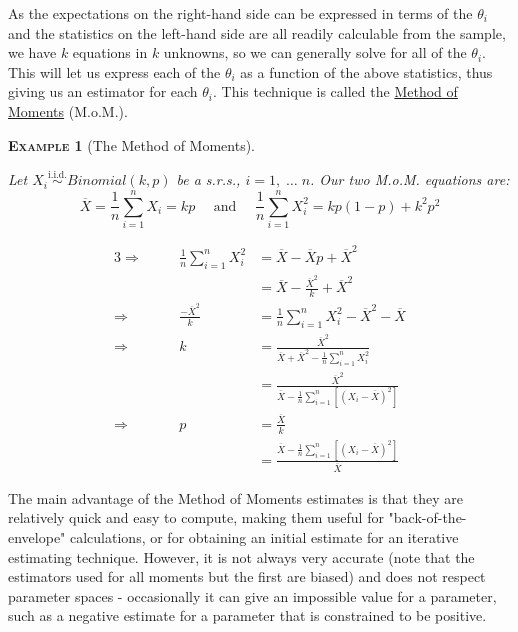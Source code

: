 \documentclass[12pt,a4paper]{article}
\newtheorem{example}{\textsc{Example}}[section]
\begin{document}
As the expectations on the right-hand side can be expressed in terms of the $\theta_i$ and the statistics on the left-hand side are all readily calculable from the sample, we have $k$ equations in $k$ unknowns, so we can generally solve for all of the $\theta_i$. This will let us express each of the $\theta_i$ as a function of the above statistics, thus giving us an estimator for each $\theta_i$. This technique is called the \underline{Method of Moments} (M.o.M.).

\begin{example}[The Method of Moments]$\;$\par\vspace{1cm}

Let $X_i \overset{\text{i.i.d.}}{\sim} Binomial(k,p)$ be a s.r.s., $i = 1,\;\hdots\;n$. Our two M.o.M. equations are:
$$\overline{X}=\frac{1}{n}\sum_{i=1}^n X_i = kp \quad\mbox{ and }\quad \frac{1}{n}\sum_{i=1}^n X_i^2 = kp(1-p) + k^2p^2$$

\begin{alignat*}{3}
\Rightarrow\quad & & \frac{1}{n} \sum_{i=1}^n X_i^2 &= \overline{X} - \overline{X}p + \overline{X}^2\\
& & &= \overline{X} - \frac{\overline{X}^2}{k} + \overline{X}^2\\
\Rightarrow \quad & & \frac{-\overline{X}^2}{k} &= \frac{1}{n}\sum_{i=1}^n X_i^2 - \overline{X}^2 - \overline{X}\\
\Rightarrow\quad & & k &= \frac{\overline{X}^2}{\overline{X}+\overline{X}^2 - \frac{1}{n}\sum\limits_{i=1}^n X_i^2}\\
& & &= \frac{\overline{X}^2}{\overline{X} - \frac{1}{n}\sum\limits_{i=1}^n \left[(X_i - \overline{X})^2\right]}\\
\Rightarrow\quad &  & p &= \frac{\overline{X}}{k}\\
& & &= \frac{\overline{X} - \frac{1}{n}\sum\limits_{i=1}^n \left[(X_i - \overline{X})^2\right]}{\overline{X}}
\end{alignat*}

\end{example}

The main advantage of the Method of Moments estimates is that they are relatively quick and easy to compute, making them useful for "back-of-the-envelope" calculations, or for obtaining an initial estimate for an iterative estimating technique. However, it is not always very accurate (note that the estimators used for all moments but the first are biased) and does not respect parameter spaces - occasionally it can give an impossible value for a parameter, such as a negative estimate for a parameter that is constrained to be positive.
\end{document}
